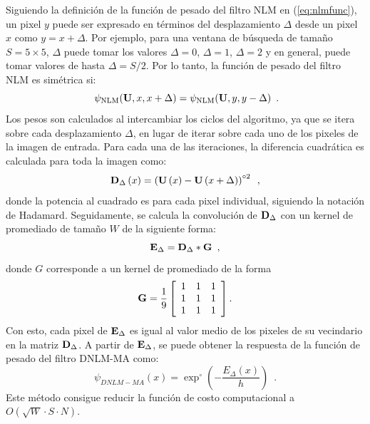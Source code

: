 Siguiendo la definición de la función de pesado del filtro NLM en (\ref{eq:nlmfunc}), un pixel $y$ puede ser expresado en términos del desplazamiento $\Delta$ desde un pixel $x$ como $y = x + \Delta$. Por ejemplo, para una ventana de búsqueda de tama\~no $S = 5 \times 5$, $\Delta$ puede tomar los valores $\Delta=0$, $\Delta=1$, $\Delta=2$ y en general, puede tomar valores de hasta $\Delta=S/2$. Por lo tanto, la función de pesado del filtro NLM es simétrica si:
%
\begin{equation}\
\psi_{\text{NLM}}(\mathbf{U}, x, x + \Delta) = \psi_{\text{NLM}}(\mathbf{U}, y, y - \Delta)  \enspace . 
\label{eq:symmetry}
\end{equation}
%
Los pesos son calculados al intercambiar los ciclos del algoritmo, ya que se itera sobre cada desplazamiento $\Delta$, en lugar de iterar sobre cada uno de los pixeles de la imagen de entrada. Para cada una de las iteraciones, la diferencia cuadrática es calculada para toda la imagen como:
%
\begin{equation}
\mathbf{D}_\Delta\left(x\right) = \left(\mathbf{U}\left(x\right) - \mathbf{U}\left( x + \Delta \right)\right)^{\circ2}  \enspace ,
\label{eq:diffquad}
\end{equation}
%
donde la potencia al cuadrado es para cada pixel individual, siguiendo la notación de Hadamard. Seguidamente, se calcula la convolución de
$\mathbf{D}_\Delta$ con un kernel de promediado de tama\~no $W$ de la siguiente forma:
\begin{equation}
\label{eq:convmoas}
\mathbf{E}_{\Delta} = \mathbf{D}_{\Delta} * \mathbf{G} \enspace ,
\end{equation}
%
donde $G$ corresponde a un kernel de promediado de la forma 
\begin{equation*}
\mathbf{G} = \frac{1}{9}\left[\begin{array}{ccc}
1 & 1 & 1\\
1 & 1 & 1\\
1 & 1 & 1
\end{array}\right].
\end{equation*}
Con esto, cada pixel de $\mathbf{E}_{\Delta}$ es igual al valor medio de los pixeles de su vecindario en la matriz $\mathbf{D}_{\Delta}$. A partir de $\mathbf{E}_{\Delta}$, se puede obtener la respuesta de la función de pesado del filtro DNLM-MA como: 
%
\begin{equation}
\psi_{DNLM-MA}\left(x\right)=\exp^{\circ}\left(-\frac{ E_\Delta\left(x\right) }{h}\right)  \enspace .
\label{eq:wmoas}
\end{equation}
%
Este m\'etodo consigue reducir la  función de costo computacional a $O(\sqrt{W} \cdot S \cdot N)$.  

